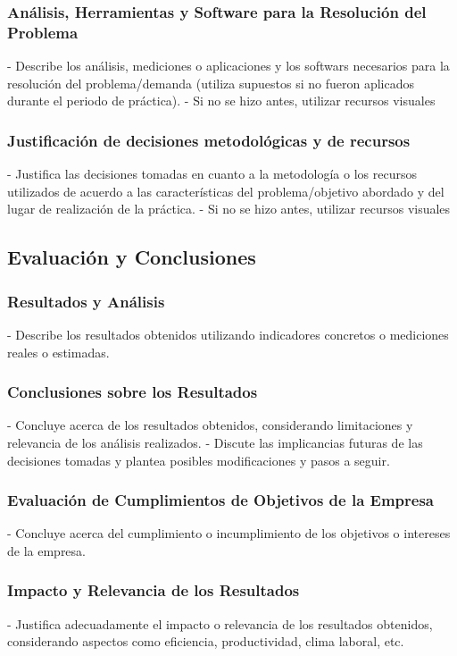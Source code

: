 \subsubsection{Análisis, Herramientas y Software para la Resolución del Problema}
    - Describe los análisis, mediciones o aplicaciones y los softwars necesarios para la resolución del problema/demanda (utiliza supuestos si no fueron aplicados durante el periodo de práctica).
    - Si no se hizo antes, utilizar recursos visuales


\subsubsection{Justificación de decisiones metodológicas y de recursos}
    - Justifica las decisiones tomadas en cuanto a la metodología o los recursos utilizados de acuerdo a las características del problema/objetivo abordado y del lugar de realización de la práctica.
    - Si no se hizo antes, utilizar recursos visuales

\subsection{Evaluación y Conclusiones}

\subsubsection{Resultados y Análisis}
    - Describe los resultados obtenidos utilizando indicadores concretos o mediciones reales o estimadas.

\subsubsection{Conclusiones sobre los Resultados}
    - Concluye acerca de los resultados obtenidos, considerando limitaciones y relevancia de los análisis realizados.
    - Discute las implicancias futuras de las decisiones tomadas y plantea posibles modificaciones y pasos a seguir.

\subsubsection{Evaluación de Cumplimientos de Objetivos de la Empresa}
    - Concluye acerca del cumplimiento o incumplimiento de los objetivos o intereses de la empresa.

\subsubsection{Impacto y Relevancia de los Resultados}
    - Justifica adecuadamente el impacto o relevancia de los resultados obtenidos, considerando aspectos como eficiencia, productividad, clima laboral, etc.

